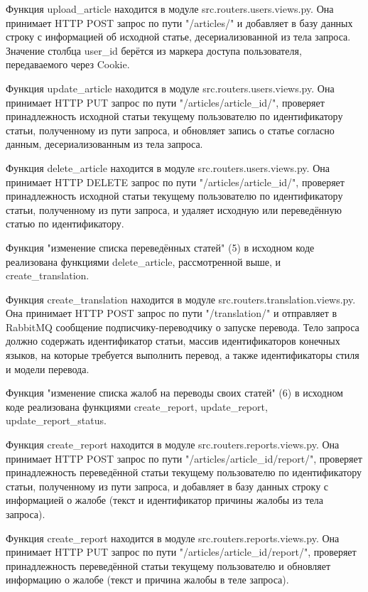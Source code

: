 Функция upload\_article находится в модуле src.routers.users.views.py. Она принимает HTTP POST запрос по пути "/articles/" и добавляет в базу данных строку с информацией об исходной статье, десериализованной из тела запроса. Значение столбца user\_id берётся из маркера доступа пользователя, передаваемого через Cookie.

Функция update\_article находится в модуле src.routers.users.views.py. Она принимает HTTP PUT запрос по пути "/articles/{article\_id}/", проверяет принадлежность исходной статьи текущему пользователю по идентификатору статьи, полученному из пути запроса, и обновляет запись о статье согласно данным, десериализованным из тела запроса.

Функция delete\_article находится в модуле src.routers.users.views.py. Она принимает HTTP DELETE запрос по пути "/articles/{article\_id}/", проверяет принадлежность исходной статьи текущему пользователю по идентификатору статьи, полученному из пути запроса, и удаляет исходную или переведённую статью по идентификатору.


Функция "изменение списка переведённых статей" (5) в исходном коде реализована функциями delete\_article, рассмотренной выше, и create\_translation.

Функция create\_translation находится в модуле src.routers.translation.views.py. Она принимает HTTP POST запрос по пути "/translation/" и отправляет в RabbitMQ сообщение подписчику-переводчику о запуске перевода. Тело запроса должно содержать идентификатор статьи, массив идентификаторов конечных языков, на которые требуется выполнить перевод, а также идентификаторы стиля и модели перевода.


Функция "изменение списка жалоб на переводы своих статей" (6) в исходном коде реализована функциями create\_report, update\_report, update\_report\_status.

Функция create\_report находится в модуле src.routers.reports.views.py. Она принимает HTTP POST запрос по пути "/articles/{article\_id}/report/", проверяет принадлежность переведённой статьи текущему пользователю по идентификатору статьи, полученному из пути запроса, и добавляет в базу данных строку с информацией о жалобе (текст и идентификатор причины жалобы из тела запроса).

Функция create\_report находится в модуле src.routers.reports.views.py. Она принимает HTTP PUT запрос по пути "/articles/{article\_id}/report/", проверяет принадлежность переведённой статьи текущему пользователю и обновляет информацию о жалобе (текст и причина жалобы в теле запроса).

